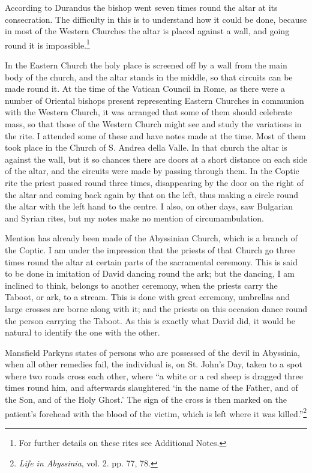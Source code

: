 \documentclass[a4paper, 11pt, oneside, polutonikogreek, english]{article}
\begin{document}
According to Durandus the bishop went seven times round the altar at its consecration. The difficulty in this is to understand how it could be done, because in most of the Western Churches the altar is placed against a wall, and going round it is impossible.\footnote{For further details on these rites see Additional Notes.}

In the Eastern Church the holy place is screened off by a wall from the main body of the church, and the altar stands in the middle, so that circuits can be made round it. At the time of the Vatican Council in Rome, as there were a number of Oriental bishops present representing Eastern Churches in communion with the Western Church, it was arranged that some of them should celebrate mass, so that those of the Western Church might see and study the variations in the rite. I attended some of these and have notes made at the time. Most of them took place in the Church of S. Andrea della Valle. In that church the altar is against the wall, but it so chances there are doors at a short distance on each side of the altar, and the circuits were made by passing through them. In the Coptic rite the priest passed round three times, disappearing by the door on the right of the altar and coming back again by that on the left, thus making a circle round the altar with the left hand to the centre. I also, on other days, saw Bulgarian and Syrian rites, but my notes make no mention of circumambulation.

Mention has already been made of the Abyssinian Church, which is a branch of the Coptic. I am under the impression that the priests of that Church go three times round the altar at certain parts of the sacramental ceremony. This is said to be done in imitation of David dancing round the ark; but the dancing, I am inclined to think, belongs to another ceremony, when the priests carry the Taboot, or ark, to a stream. This is done with great ceremony, umbrellas and large crosses are borne along with it; and the priests on this occasion dance round the person carrying the Taboot. As this is exactly what David did, it would be natural to identify the one with the other.

Mansfield Parkyns states of persons who are possessed of the devil in Abyssinia, when all other remedies fail, the individual is, on St. John's Day, taken to a spot where two roads cross each other, where ``a white or a red sheep is dragged three times round him, and afterwards slaughtered `in the name of the Father, and of the Son, and of the Holy Ghost.' The sign of the cross is then marked on the patient's forehead with the blood of the victim, which is left where it was killed.''\footnote{\emph{Life in Abyssinia}, vol. 2. pp. 77, 78.}
\end{document}

